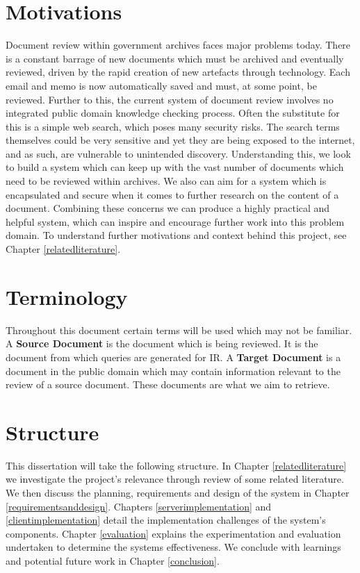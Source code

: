 \documentclass{l4proj}
\begin{document}
\section{Motivations}
Document review within government archives faces major problems today. There is a constant barrage of new documents which must be archived and eventually reviewed, driven by the rapid creation of new artefacts through technology. Each email and memo is now automatically saved and must, at some point, be reviewed.
Further to this, the current system of document review involves no integrated public domain knowledge checking process. Often the substitute for this is a simple web search, which poses many security risks. The search terms themselves could be very sensitive and yet they are being exposed to the internet, and as such, are vulnerable to unintended discovery.
Understanding this, we look to build a system which can keep up with the vast number of documents which need to be reviewed within archives. We also can aim for a system which is encapsulated and secure when it comes to further research on the content of a document.
Combining these concerns we can produce a highly practical and helpful system, which can inspire and encourage further work into this problem domain. To understand further motivations and context behind this project, see Chapter \ref{relatedliterature}.

\section{Terminology}
Throughout this document certain terms will be used which may not be familiar.
A \textbf{Source Document} is the document which is being reviewed. It is the document from which queries are generated for IR.
A \textbf{Target Document} is a document in the public domain which may contain information relevant to the review of a source document. These documents are what we aim to retrieve.

\section{Structure}
This dissertation will take the following structure.
In Chapter \ref{relatedliterature} we investigate the project's relevance through review of some related literature. We then discuss the planning, requirements and design of the system in Chapter \ref{requirementsanddesign}. Chapters \ref{serverimplementation} and \ref{clientimplementation} detail the implementation challenges of the system's components. Chapter \ref{evaluation} explains the experimentation and evaluation undertaken to determine the systems effectiveness. We conclude with learnings and potential future work in Chapter \ref{conclusion}.
\end{document}
